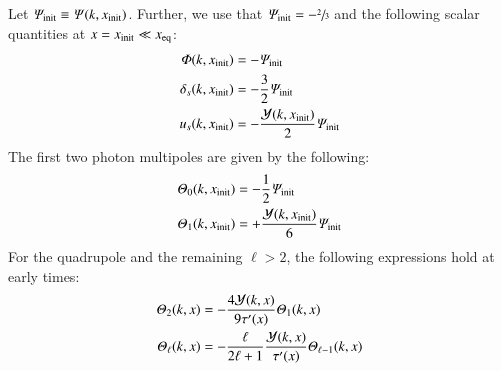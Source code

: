 Let $\varPsi_\mathrm{init}\equiv\varPsi(k, x_\mathrm{init})$. Further, we use that $\varPsi_\mathrm{init}=-\sfrac{2}{3}$ and the following scalar quantities at $x=x_\mathrm{init} \ll x_\mathrm{eq}$:
\begin{subequations}\label{app:pert:eq:initial_conditions}
\begin{align}
    \varPhi(k, x_\mathrm{init})     &= -\varPsi_\mathrm{init}                                 \label{app:pert:eq:init_Phi}\\
    \delta_s(k, x_\mathrm{init}) &= -\frac{3}{2} \varPsi_\mathrm{init}                     \label{app:pert:eq:init_delta}\\
    u_s(k, x_\mathrm{init})      &= -\frac{\mathcal{Y}(k, x_\mathrm{init})}{2} \varPsi_\mathrm{init}  \label{app:pert:eq:init_u}
\end{align}
\end{subequations}
The first two photon multipoles are given by the following:
\begin{subequations}\label{app:pert:eq:initial_conditions_Theta01}
\begin{align}
    \varTheta_0(k, x_\mathrm{init}) &= -\frac{1}{2}\varPsi_\mathrm{init}        \label{app:pert:eq:init_Theta0}\\
    \varTheta_1(k, x_\mathrm{init}) &= +\frac{\mathcal{Y}(k, x_\mathrm{init})}{6}\varPsi_\mathrm{init}     \label{app:pert:eq:init_Theta1}
\end{align}
\end{subequations}
For the quadrupole and the remaining $\ell >2$, the following expressions hold at early times:
\begin{subequations}\label{app:pert:eq:initial_conditions_Theta2ell}
\begin{align}
    \varTheta_2(k, x) &= -\frac{4\mathcal{Y}(k, x)}{9\tau'(x)}\varTheta_{1}(k,x)\label{app:pert:eq:init_Theta2} \\
    \varTheta_\ell(k, x) &= -\frac{\ell}{2\ell+1} \frac{\mathcal{Y}(k, x)}{\tau'(x)} \varTheta_{\ell-1}(k,x) \label{app:pert:eq:init_Thetaell}
\end{align}
\end{subequations}













